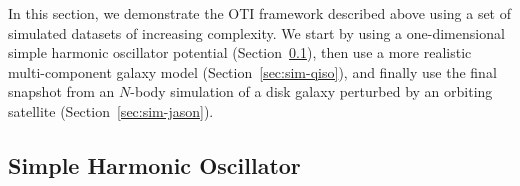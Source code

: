 
In this section, we demonstrate the OTI framework described above using a set of
simulated datasets of increasing complexity.
We start by using a one-dimensional simple harmonic oscillator potential
(Section~\ref{sec:sim-sho}), then use a more realistic multi-component galaxy model
(Section~\ref{sec:sim-qiso}), and finally use the final snapshot from an $N$-body
simulation of a disk galaxy perturbed by an orbiting satellite
(Section~\ref{sec:sim-jason}).


\subsection{Simple Harmonic Oscillator}
\label{sec:sim-sho}

